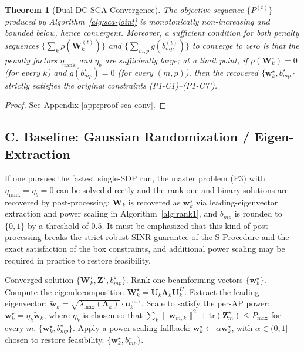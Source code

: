 \documentclass[12pt,a4paper]{article}
\newtheorem{theorem}{Theorem}
\newcommand{\vect}[1]{\mathbf{#1}}
\newcommand{\mat}[1]{\mathbf{#1}}
\newcommand{\tr}{\text{tr}}
\begin{document}
\begin{theorem}[Dual DC SCA Convergence]\label{thm:sca-conv}
The objective sequence $\{P^{(t)}\}$ produced by Algorithm~\ref{alg:sca-joint} is monotonically non-increasing and bounded below, hence convergent. Moreover, a sufficient condition for both penalty sequences $\{\sum_k \rho(\mat{W}_k^{(t)})\}$ and $\{\sum_{m,p} g(b_{mp}^{(t)})\}$ to converge to zero is that the penalty factors $\eta_{\text{rank}}$ and $\eta_b$ are sufficiently large; at a limit point, if $\rho(\mat{W}_k^\star) = 0$ (for every $k$) and $g(b_{mp}^\star) = 0$ (for every $(m, p)$), then the recovered $\{\vect{w}_k^\star, b_{mp}^\star\}$ strictly satisfies the original constraints (P1-C1)--(P1-C7').
\end{theorem}

\begin{proof}
See Appendix \ref{app:proof-sca-conv}.
\end{proof}

\subsection*{C. Baseline: Gaussian Randomization / Eigen-Extraction}

If one pursues the fastest single-SDP run, the master problem (P3) with $\eta_{\text{rank}} = \eta_b = 0$ can be solved directly and the rank-one and binary solutions are recovered by post-processing: $\mat{W}_k$ is recovered as $\vect{w}_k^\star$ via leading-eigenvector extraction and power scaling in Algorithm~\ref{alg:rank1}, and $b_{mp}$ is rounded to $\{0,1\}$ by a threshold of $0.5$. It must be emphasized that this kind of post-processing breaks the strict robust-SINR guarantee of the S-Procedure and the exact satisfaction of the box constraints, and additional power scaling may be required in practice to restore feasibility.

\begin{algorithm}[htbp]
\caption{Rank-One Beamforming Extraction (Baseline Post-Processing)}
\label{alg:rank1}
\begin{algorithmic}[1]
\Require Converged solution $\{\mat{W}_k^\star, \mat{Z}^\star, b_{mp}^\star\}$.
\Ensure Rank-one beamforming vectors $\{\vect{w}_k^\star\}$.
    \State Compute the eigendecomposition $\mat{W}_k^\star = \mat{U}_k \mat{\Lambda}_k \mat{U}_k^H$.
    \State Extract the leading eigenvector: $\tilde{\vect{w}}_k = \sqrt{\lambda_{\max}(\mat{\Lambda}_k)} \cdot \mat{u}_k^{\max}$.
    \State Scale to satisfy the per-AP power: $\vect{w}_k^\star = \eta_k \tilde{\vect{w}}_k$, where $\eta_k$ is chosen so that $\sum_k \|\vect{w}_{m,k}\|^2 + \tr(\mat{Z}_m^\star) \leq P_{\max}$ for every $m$.
\EndFor
\If{$\{\vect{w}_k^\star, b_{mp}^\star\}$ satisfies all of (P1-C1)--(P1-C7')}
    \State \Return $\{\vect{w}_k^\star, b_{mp}^\star\}$.
\Else
    \State Apply a power-scaling fallback: $\vect{w}_k^\star \leftarrow \alpha \vect{w}_k^\star$, with $\alpha \in (0, 1]$ chosen to restore feasibility.
    \State \Return $\{\vect{w}_k^\star, b_{mp}^\star\}$.
\EndIf
\end{algorithmic}
\end{algorithm}
\end{document}
